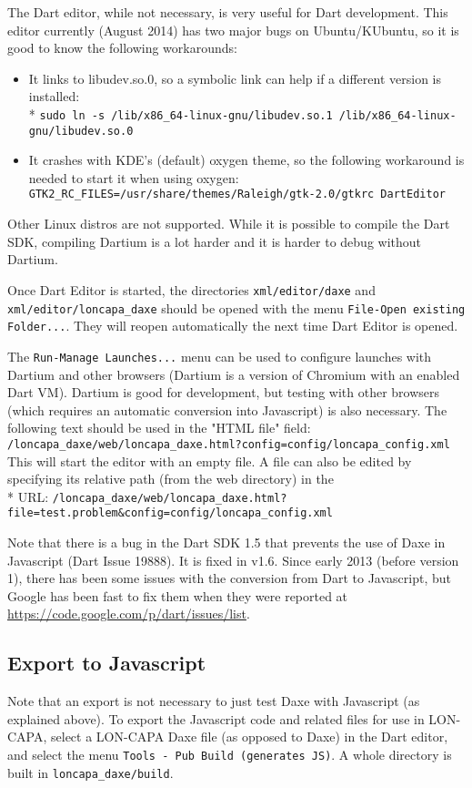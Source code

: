 The Dart editor, while not necessary, is very useful for Dart development. This editor currently (August 2014) has two major bugs on Ubuntu/KUbuntu, so it is good to know the following workarounds:
\begin{itemize}
\item It links to libudev.so.0, so a symbolic link can help if a different version is installed: \\*
  \texttt{sudo ln -s /lib/x86\_64-linux-gnu/libudev.so.1 /lib/x86\_64-linux-gnu/libudev.so.0}
\item It crashes with KDE's (default) oxygen theme, so the following workaround is needed to start it when using oxygen:
  \texttt{GTK2\_RC\_FILES=/usr/share/themes/Raleigh/gtk-2.0/gtkrc DartEditor}
\end{itemize}

Other Linux distros are not supported. While it is possible to compile the Dart SDK, compiling Dartium is a lot harder and it is harder to debug without Dartium.

Once Dart Editor is started, the directories \texttt{xml/editor/daxe} and \texttt{xml/editor/loncapa\_daxe} should be opened with the menu \texttt{File-Open existing Folder...}. They will reopen automatically the next time Dart Editor is opened.

The \texttt{Run-Manage Launches...} menu can be used to configure launches with Dartium and other browsers (Dartium is a version of Chromium with an enabled Dart VM). Dartium is good for development, but testing with other browsers (which requires an automatic conversion into Javascript) is also necessary.
The following text should be used in the "HTML file" field:
\texttt{/loncapa\_daxe/web/loncapa\_daxe.html?config=config/loncapa\_config.xml}
This will start the editor with an empty file. A file can also be edited by specifying its relative path (from the web directory) in the \\*
URL: \texttt{/loncapa\_daxe/web/loncapa\_daxe.html?file=test.problem\&config=config/loncapa\_config.xml}

Note that there is a bug in the Dart SDK 1.5 that prevents the use of Daxe in Javascript (Dart Issue 19888). It is fixed in v1.6. Since early 2013 (before version 1), there has been some issues with the conversion from Dart to Javascript, but Google has been fast to fix them when they were reported at \url{https://code.google.com/p/dart/issues/list}.

\subsection{Export to Javascript}

Note that an export is not necessary to just test Daxe with Javascript (as explained above).
To export the Javascript code and related files for use in LON-CAPA, select a LON-CAPA Daxe file (as opposed to Daxe) in the Dart editor,
and select the menu \texttt{Tools - Pub Build (generates JS)}. A whole directory is built in \texttt{loncapa_daxe/build}.
